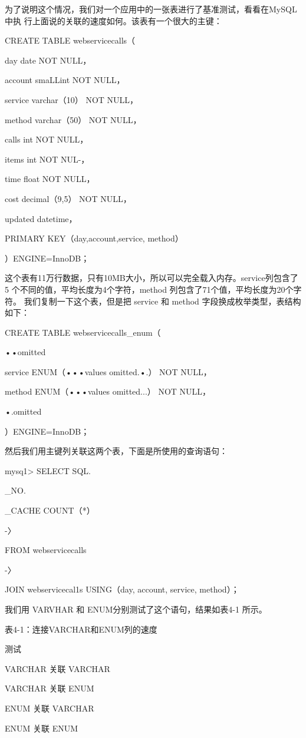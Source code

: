 为了说明这个情况，我们对一个应用中的一张表进行了基准测试，看看在MySQL 中执
行上面说的关联的速度如何。该表有一个很大的主键：

CREATE TABLE webservicecalls（

day date NOT NULL，

account smaLLint NOT NULL，

service varchar（10） NOT NULL，

method varchar（50） NOT NULL，

calls int NOT NULL，

items int NOT NUL-，

time float NOT NULL，

cost decimal（9,5） NOT NULL，

updated datetime，

PRIMARY KEY（day,account,service, method）

）ENGINE=InnoDB；

这个表有11万行数据，只有10MB大小，所以可以完全载入内存。service列包含了5
个不同的值，平均长度为4个字符，method 列包含了71个值，平均长度为20个字符。
我们复制一下这个表，但是把 service 和 method 字段换成枚举类型，表结构如下：

CREATE TABLE webservicecalls\_enum（

••omitted

service ENUM（•••values omitted.•.） NOT NULL，

method ENUM（•••values omitted...） NOT NULL，

•.omitted

）ENGINE=InnoDB；

然后我们用主键列关联这两个表，下面是所使用的查询语句：

mysq1> SELECT SQL.

\_NO.

\_CACHE COUNT（*）

-〉

FROM webservicecalls

-〉

JOIN webservicecal1s USING（day, account, service, method）；

我们用 VARVHAR 和 ENUM分别测试了这个语句，结果如表4-1 所示。

表4-1：连接VARCHAR和ENUM列的速度

测试

VARCHAR 关联 VARCHAR

VARCHAR 关联 ENUM

ENUM 关联 VARCHAR

ENUM 关联 ENUM

